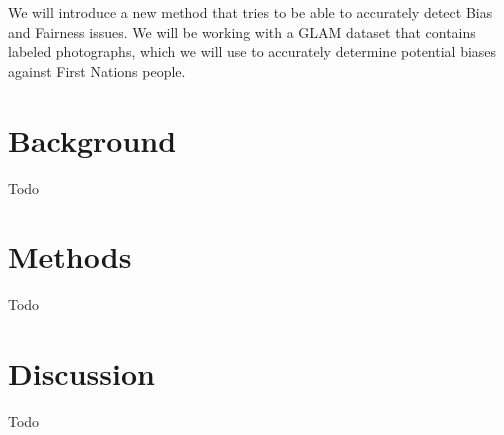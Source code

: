 \documentclass[12pt,a4paper,titlepage,oneside,english]{article}
\begin{document}
We will introduce a new method that tries to be able to accurately detect Bias and Fairness issues. We will be working with a GLAM dataset that contains labeled photographs, which we will use to accurately determine potential biases against First Nations people. 





\section{Background}

Todo

\section{Methods}

Todo

\section{Discussion}

Todo

\newpage
\setcounter{page}{1}
\onehalfspacing
{}


\end{document}
